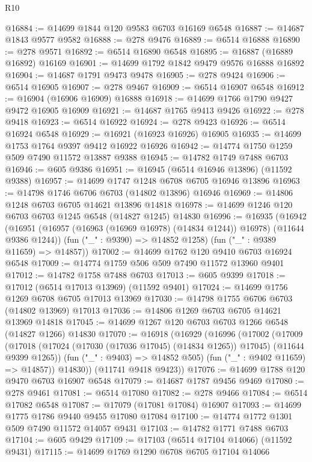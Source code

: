 \begin{lexlean}{R10}
\begin{coremodule}
@16884 := @14699 @1844 @120 @9583 @6703 @16169 @6548
@16887 := @14687 @1843 @9577 @9582
@16888 := @278 @9476
@16889 := @6514 @16888
@16890 := @278 @9571
@16892 := @6514 @16890 @6548
@16895 := @16887 (@16889 @16892) @16169
@16901 := @14699 @1792 @1842 @9479 @9576 @16888 @16892
@16904 := @14687 @1791 @9473 @9478
@16905 := @278 @9424
@16906 := @6514 @16905
@16907 := @278 @9467
@16909 := @6514 @16907 @6548
@16912 := @16904 (@16906 @16909) @16888
@16918 := @14699 @1766 @1790 @9427 @9472 @16905 @16909
@16921 := @14687 @1765 @9413 @9426
@16922 := @278 @9418
@16923 := @6514 @16922
@16924 := @278 @9423
@16926 := @6514 @16924 @6548
@16929 := @16921 (@16923 @16926) @16905
@16935 := @14699 @1753 @1764 @9397 @9412 @16922 @16926
@16942 := @14774 @1750 @1259 @509 @7490 @11572 @13887 @9388
@16945 := @14782 @1749 @7488 @6703
@16946 := @605 @9386
@16951 := @16945 (@6514 @16946 @13896) (@11592 @9388)
@16957 := @14699 @1747 @1248 @6708 @6705 @16946 @13896
@16963 := @14798 @1746 @6706 @6703 (@14802 @13896) @16946
@16969 := @14806 @1248 @6703 @6705 @14621 @13896 @14818
@16978 := @14699 @1246 @120 @6703 @6703 @1245 @6548 (@14827 @1245) @14830
@16996 := @16935
    (@16942
      (@16951 (@16957 (@16963 (@16969 @16978) (@14834 @1244)) @16978) (@11644 @9386 @1244))
      (fun ("_" : @9390) => @14852 @1258)
      (fun ("_" : @9389 @11659) => @14857))
@17002 := @14699 @1762 @120 @9410 @6703 @16924 @6548
@17009 := @14774 @1759 @506 @509 @7490 @11572 @13960 @9401
@17012 := @14782 @1758 @7488 @6703
@17013 := @605 @9399
@17018 := @17012 (@6514 @17013 @13969) (@11592 @9401)
@17024 := @14699 @1756 @1269 @6708 @6705 @17013 @13969
@17030 := @14798 @1755 @6706 @6703 (@14802 @13969) @17013
@17036 := @14806 @1269 @6703 @6705 @14621 @13969 @14818
@17045 := @14699 @1267 @120 @6703 @6703 @1266 @6548 (@14827 @1266) @14830
@17070 := @16918
    (@16929
      (@16996
        (@17002
          (@17009
            (@17018 (@17024 (@17030 (@17036 @17045) (@14834 @1265)) @17045) (@11644 @9399 @1265))
            (fun ("_" : @9403) => @14852 @505)
            (fun ("_" : @9402 @11659) => @14857))
          @14830))
      (@11741 @9418 @9423))
@17076 := @14699 @1788 @120 @9470 @6703 @16907 @6548
@17079 := @14687 @1787 @9456 @9469
@17080 := @278 @9461
@17081 := @6514 @17080
@17082 := @278 @9466
@17084 := @6514 @17082 @6548
@17087 := @17079 (@17081 @17084) @16907
@17093 := @14699 @1775 @1786 @9440 @9455 @17080 @17084
@17100 := @14774 @1772 @1301 @509 @7490 @11572 @14057 @9431
@17103 := @14782 @1771 @7488 @6703
@17104 := @605 @9429
@17109 := @17103 (@6514 @17104 @14066) (@11592 @9431)
@17115 := @14699 @1769 @1290 @6708 @6705 @17104 @14066

\end{coremodule}
\end{lexlean}
